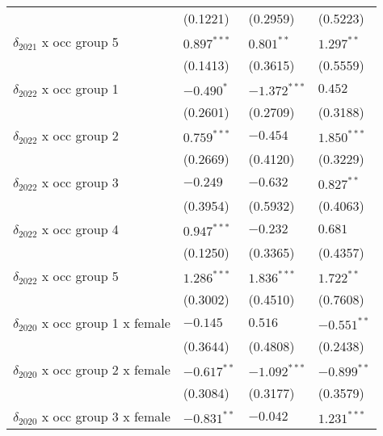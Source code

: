 \begin{tabular}{llll}
                                       &           (0.1221) &           (0.2959) &           (0.5223) \\
$\delta_{2021}$ x occ group 5          &      $0.897^{***}$ &       $0.801^{**}$ &       $1.297^{**}$ \\
                                       &           (0.1413) &           (0.3615) &           (0.5559) \\
$\delta_{2022}$ x occ group 1          &         $-0.490^*$ &     $-1.372^{***}$ &            $0.452$ \\
                                       &           (0.2601) &           (0.2709) &           (0.3188) \\
$\delta_{2022}$ x occ group 2          &      $0.759^{***}$ &           $-0.454$ &      $1.850^{***}$ \\
                                       &           (0.2669) &           (0.4120) &           (0.3229) \\
$\delta_{2022}$ x occ group 3          &           $-0.249$ &           $-0.632$ &       $0.827^{**}$ \\
                                       &           (0.3954) &           (0.5932) &           (0.4063) \\
$\delta_{2022}$ x occ group 4          &      $0.947^{***}$ &           $-0.232$ &            $0.681$ \\
                                       &           (0.1250) &           (0.3365) &           (0.4357) \\
$\delta_{2022}$ x occ group 5          &      $1.286^{***}$ &      $1.836^{***}$ &       $1.722^{**}$ \\
                                       &           (0.3002) &           (0.4510) &           (0.7608) \\
$\delta_{2020}$ x occ group 1 x female &           $-0.145$ &            $0.516$ &      $-0.551^{**}$ \\
                                       &           (0.3644) &           (0.4808) &           (0.2438) \\
$\delta_{2020}$ x occ group 2 x female &      $-0.617^{**}$ &     $-1.092^{***}$ &      $-0.899^{**}$ \\
                                       &           (0.3084) &           (0.3177) &           (0.3579) \\
$\delta_{2020}$ x occ group 3 x female &      $-0.831^{**}$ &           $-0.042$ &      $1.231^{***}$ \\

\end{tabular}
